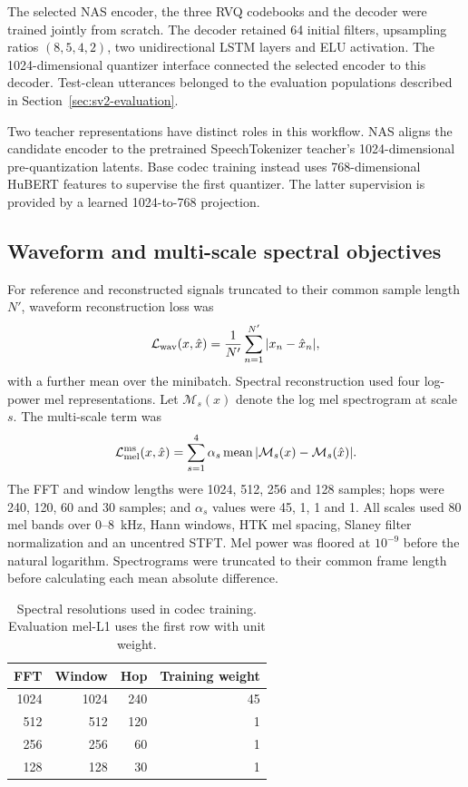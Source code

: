 The selected NAS encoder, the three RVQ codebooks and the decoder were trained jointly from scratch. The decoder retained 64 initial filters, upsampling ratios $(8,5,4,2)$, two unidirectional LSTM layers and ELU activation. The 1024-dimensional quantizer interface connected the selected encoder to this decoder. Test-clean utterances belonged to the evaluation populations described in Section~\ref{sec:sv2-evaluation}.

Two teacher representations have distinct roles in this workflow. NAS aligns the candidate encoder to the pretrained SpeechTokenizer teacher's 1024-dimensional pre-quantization latents. Base codec training instead uses 768-dimensional HuBERT features to supervise the first quantizer. The latter supervision is provided by a learned 1024-to-768 projection.

\subsection{Waveform and multi-scale spectral objectives}
For reference and reconstructed signals truncated to their common sample length $N'$, waveform reconstruction loss was
\begin{equation}
 \mathcal L_{\rm wav}(x,\hat x)
 =\frac{1}{N'}\sum_{n=1}^{N'}|x_n-\hat x_n|,
 \label{eq:sv2-wav}
\end{equation}
with a further mean over the minibatch. Spectral reconstruction used four log-power mel representations. Let $\mathcal M_s(x)$ denote the log mel spectrogram at scale $s$. The multi-scale term was
\begin{equation}
 \mathcal L_{\rm mel}^{\rm ms}(x,\hat x)
 =\sum_{s=1}^{4}\alpha_s
     \operatorname{mean}|\mathcal M_s(x)-\mathcal M_s(\hat x)|.
 \label{eq:sv2-msmel}
\end{equation}
The FFT and window lengths were 1024, 512, 256 and 128 samples; hops were 240, 120, 60 and 30 samples; and $\alpha_s$ values were 45, 1, 1 and 1. All scales used 80 mel bands over 0--8~kHz, Hann windows, HTK mel spacing, Slaney filter normalization and an uncentred STFT. Mel power was floored at $10^{-9}$ before the natural logarithm. Spectrograms were truncated to their common frame length before calculating each mean absolute difference.

\begin{table}[t]
\centering
\caption{Spectral resolutions used in codec training. Evaluation mel-L1 uses the first row with unit weight.}
\label{tab:sv2-mels}
\small
\begin{tabular}{@{}rrrr@{}}
\toprule
FFT & Window & Hop & Training weight\\
\midrule
1024 & 1024 & 240 & 45\\
512 & 512 & 120 & 1\\
256 & 256 & 60 & 1\\
128 & 128 & 30 & 1\\
\bottomrule
\end{tabular}
\end{table}

